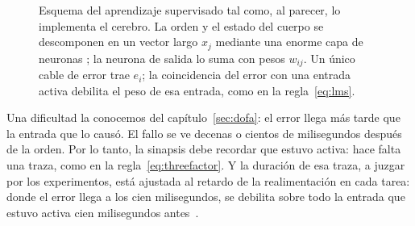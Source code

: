 \begin{figure}[t]
\centering
{}
\caption{Esquema del aprendizaje supervisado tal como, al parecer, lo implementa el cerebro. La orden y el estado del cuerpo se descomponen en un vector largo $x_j$ mediante una enorme capa de neuronas ; la neurona  de salida lo suma con pesos $w_{ij}$. Un único cable de error trae $e_i$; la coincidencia del error con una entrada activa debilita el peso de esa entrada, como en la regla~\eqref{eq:lms}.}
\label{fig:errorwire}
\end{figure}

Una dificultad la conocemos del capítulo~\ref{sec:dofa}: el error llega más tarde que la entrada que lo causó. El fallo se ve decenas o cientos de milisegundos después de la orden. Por lo tanto, la sinapsis debe recordar que estuvo activa: hace falta una traza, como en la regla~\eqref{eq:threefactor}. Y la duración de esa traza, a juzgar por los experimentos, está ajustada al retardo de la realimentación en cada tarea: donde el error llega a los cien milisegundos, se debilita sobre todo la entrada que estuvo activa cien milisegundos antes~\cite{Suvrathan2016}.

